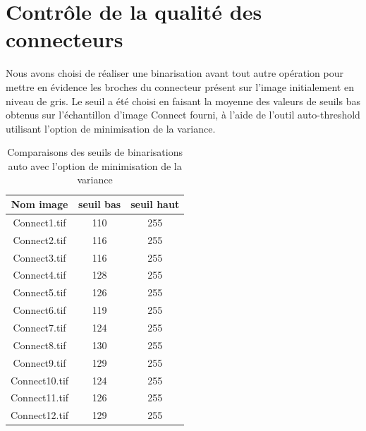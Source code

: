 \documentclass{scrreprt}
\begin{document}
\tableofcontents

\chapter{Contrôle de la qualité des connecteurs}

Nous avons choisi de réaliser une binarisation avant tout autre opération pour mettre en évidence les broches 
du connecteur présent sur l'image initialement en niveau de gris. Le seuil a été choisi en faisant la moyenne 
des valeurs de seuils bas obtenus sur l'échantillon d'image Connect fourni, 
à l'aide de l'outil auto-threshold utilisant l'option de minimisation de la variance.

\begin{table}[!h]
        \begin{center}
                \begin{tabular}{|c|c|c|}
                   \hline
                   Nom image & seuil bas & seuil haut \\
                   \hline
                   Connect1.tif & 110  & 255 \\
                   \hline
                   Connect2.tif & 116 & 255  \\
                   \hline
		   Connect3.tif & 116 & 255 \\
                   \hline 
		   Connect4.tif & 128 & 255 \\
                   \hline 
		   Connect5.tif & 126 & 255 \\
                   \hline 
		   Connect6.tif & 119 & 255 \\
                   \hline 
		   Connect7.tif & 124 & 255 \\
                   \hline 
		   Connect8.tif & 130 & 255 \\
                   \hline 
		   Connect9.tif & 129 & 255 \\
                   \hline 
		   Connect10.tif & 124 & 255 \\
		   \hline
 		   Connect11.tif & 126 & 255 \\
                   \hline
		   Connect12.tif & 129 & 255 \\
                   \hline 
 	
                \end{tabular}
        \end{center}
        \caption{Comparaisons des seuils de binarisations auto avec l'option de minimisation de la variance}
\end{table}
\end{document}
